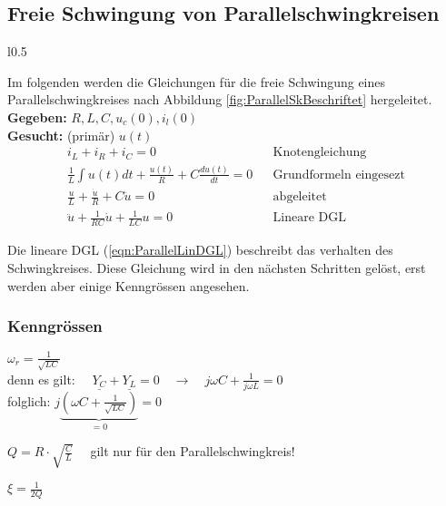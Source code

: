 \subsection{Freie Schwingung von Parallelschwingkreisen}
\begin{wrapfigure}{l}{0.5\textwidth}
	\centering
	
	\caption{Parallelschwingkreis}
	\label{fig:ParallelSkBeschriftet}
\end{wrapfigure}
Im folgenden werden die Gleichungen für die freie Schwingung eines
Parallelschwingkreises nach Abbildung \ref{fig:ParallelSkBeschriftet}
hergeleitet.
\\

\textbf{Gegeben:} $R,L,C, u_c(0), i_l(0)$\\

\textbf{Gesucht:} (primär) $u(t)$ \\

\begin{align}
 i_L + i_R + i_C = 0 
 && \text{Knotengleichung} \\
 \frac{1}{L}\int{u(t)}dt + \frac{u(t)}{R} + C \frac{du(t)}{dt} = 0 
 && \text{Grundformeln eingesezt}\\
 \frac{u}{L} + \frac{\dot{u}}{R} + C \ddot{u} = 0
 && \text{abgeleitet} \\
 \boxed{\ddot{u} + \frac{1}{RC}\dot{u} + \frac{1}{LC}u = 0}
 && \text{Lineare DGL} \label{eqn:ParallelLinDGL}
\end{align}

Die lineare DGL (\ref{eqn:ParallelLinDGL}) beschreibt das verhalten des
Schwingkreises. Diese Gleichung wird in den nächsten Schritten gelöst, erst
werden aber einige Kenngrössen angesehen.

\subsubsection{Kenngrössen}
\begin{description}
[style=multiline,topsep=0pt,leftmargin=4.5cm,rightmargin=2cm]
\item[Resonanzfrequenz]
	$\omega_r = \frac{1}{\sqrt{LC}} $\\
	denn es gilt:
	$\quad \underline{Y_C} + \underline{Y_L} = 0  \quad \rightarrow \quad j
	\omega C + \frac{1}{j \omega L} = 0$ \\
	folglich: $j\underbrace{(\omega C + \frac{1}{\sqrt{LC}})}_{=0} = 0$
\item[Güte Q] 
	$Q = R \cdot \sqrt{\frac{C}{L}} \quad$ gilt nur für den
	Parallelschwingkreis!
\item[Dämpfungsgrad $\xi$]
	$\xi = \frac{1}{2Q}$
\end{description}


